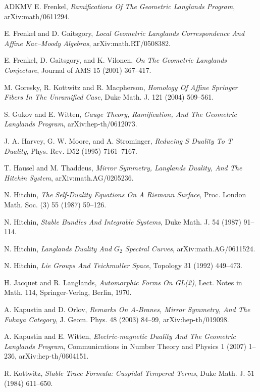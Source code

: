 \begin{thebibliography}{ADKMV}
 E. Frenkel, \emph{Ramifications Of The Geometric Langlands Program}, arXiv:math/0611294.

 E. Frenkel and D. Gaitsgory, \emph{Local Geometric Langlands Correspondence And Affine Kac--Moody Algebras}, arXiv:math.RT/0508382.

 E. Frenkel, D. Gaitsgory, and K. Vilonen, \emph{On The Geometric Langlands Conjecture}, Journal of AMS 15 (2001) 367--417.

 M. Goresky, R. Kottwitz and R. Macpherson, \emph{Homology Of Affine Springer Fibers In The Unramified Case}, Duke Math. J. 121 (2004) 509--561.

 S. Gukov and E. Witten, \emph{Gauge Theory, Ramification, And The Geometric Langlands Program}, arXiv:hep-th/0612073.

 J. A. Harvey, G. W. Moore, and A. Strominger, \emph{Reducing S Duality To T Duality}, Phys. Rev. D52 (1995) 7161--7167.

 T. Hausel and M. Thaddeus, \emph{Mirror Symmetry, Langlands Duality, And The Hitchin System}, arXiv:math.AG/0205236.

 N. Hitchin, \emph{The Self-Duality Equations On A Riemann Surface}, Proc. London Math. Soc. (3) 55 (1987) 59--126.

 N. Hitchin, \emph{Stable Bundles And Integrable Systems}, Duke Math. J. 54 (1987) 91--114.

 N. Hitchin, \emph{Langlands Duality And $G_2$ Spectral Curves}, arXiv:math.AG/0611524.

 N. Hitchin, \emph{Lie Groups And Teichmuller Space}, Topology 31 (1992) 449--473.

 H. Jacquet and R. Langlands, \emph{Automorphic Forms On GL(2)}, Lect. Notes in Math. 114, Springer-Verlag, Berlin, 1970.

 A. Kapustin and D. Orlov, \emph{Remarks On A-Branes, Mirror Symmetry, And The Fukaya Category}, J. Geom. Phys. 48 (2003) 84--99, arXiv:hep-th/019098.

 A. Kapustin and E. Witten, \emph{Electric-magnetic Duality And The Geometric Langlands Program}, Communications in Number Theory and Physics 1 (2007) 1--236, arXiv:hep-th/0604151.

 R. Kottwitz, \emph{Stable Trace Formula: Cuspidal Tempered Terms}, Duke Math. J. 51 (1984) 611--650.


\end{thebibliography}
